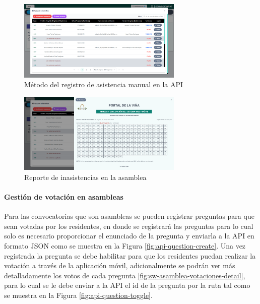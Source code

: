 \begin{figure}[H]
    \centering
    \includegraphics[width=0.7\textwidth]{resources/images/sw-asamblea-asistencia}
    \caption{Método del registro de asistencia manual en la API}
    \label{fig:sw-asamblea-asistencia}
\end{figure}

\begin{figure}[H]
    \centering
    \includegraphics[width=0.7\textwidth]{resources/images/sw-asamblea-asistencia-reporte}
    \caption{Reporte de inasistencias en la asamblea}
    \label{fig:sw-asamblea-asistencia-reporte}
\end{figure}

\paragraph{Gestión de votación en asambleas}

Para las convocatorias que son asambleas se pueden registrar preguntas para que sean votadas por los residentes, en donde se registrará las preguntas para lo cual solo es necesario proporcionar el enunciado de la pregunta y enviarla a la API en formato JSON como se muestra en la Figura \ref{fig:api-question-create}.
Una vez registrada la pregunta se debe habilitar para que los residentes puedan realizar la votación a través de la aplicación móvil, adicionalmente se podrán ver más detalladamente los votos de cada pregunta \ref{fig:sw-asamblea-votaciones-detail}, para lo cual se le debe enviar a la API el id de la pregunta por la ruta tal como se muestra en la Figura \ref{fig:api-question-toggle}.

